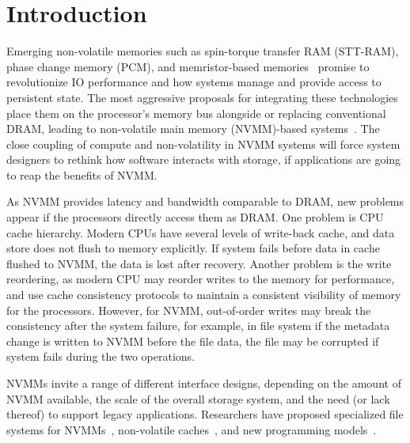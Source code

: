 \section{Introduction}
\label{sec:introduction}

Emerging non-volatile memories such as spin-torque transfer RAM (STT-RAM),
phase change memory (PCM), and
memristor-based memories~\cite{moneta, monetad, quicksan,Onyx,
pollisbetterthaninterrupt}
promise to revolutionize IO performance and how
systems manage and provide access to persistent state. The most aggressive
proposals for integrating these technologies place them on the processor's
memory bus alongside or replacing conventional DRAM, leading to non-volatile
main memory (NVMM)-based systems~\cite{PCM_EfficientMainMemory, PCMHierarchy,eNVy,WSP}. The close coupling of compute and
non-volatility in NVMM systems will force system designers to rethink how software interacts with storage, if applications are going to reap the benefits of NVMM.

As NVMM provides latency and bandwidth comparable to DRAM, new problems
appear if the processors directly access them as DRAM. One problem is 
CPU cache hierarchy. Modern CPUs have several levels of write-back cache,
 and data store does not flush to memory explicitly. If system fails before
data in cache flushed to NVMM, the data is lost after recovery. Another
problem is the write reordering, as modern CPU may reorder writes to the
memory for performance, and use cache consistency protocols to maintain
a consistent visibility of memory for the processors. However, for NVMM,
out-of-order writes may break the consistency after the system failure,
for example, in file system if the metadata change is written to NVMM before
the file data, the file may be corrupted if system fails during the two 
operations. 

NVMMs invite a range of different interface designs, depending on the amount of
NVMM available, the scale of the overall storage system, and the need (or lack
thereof) to support legacy applications.  Researchers have proposed specialized
file systems for NVMMs~\cite{PMFS,BPFS}, non-volatile
caches~\cite{RVM,riovista}, and new programming
models~\cite{nvheaps,mnemosyne}.



